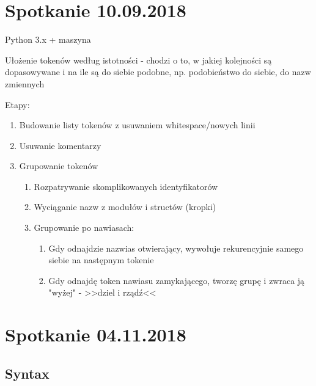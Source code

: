 \documentclass[11pt,oneside,a4paper,onecolumn]{article}
\begin{document}
\section{Spotkanie 10.09.2018}
Python 3.x + maszyna

Ułożenie tokenów według istotności - chodzi o to, w jakiej kolejności są dopasowywane i na ile są do siebie podobne, np. podobieństwo do siebie, do nazw zmiennych

Etapy:
\begin{enumerate}
\item Budowanie listy tokenów z usuwaniem whitespace/nowych linii
\item Usuwanie komentarzy
\item Grupowanie tokenów
\begin{enumerate}
 \item Rozpatrywanie skomplikowanych identyfikatorów
 \item Wyciąganie nazw z modułów i structów (kropki)
 \item Grupowanie po nawiasach: 
 \begin{enumerate}
 	\item Gdy odnajdzie nazwias otwierający, wywołuje rekurencyjnie samego siebie na następnym tokenie
 	\item Gdy odnajdę token nawiasu zamykającego, tworzę grupę i zwraca ją "wyżej" - >>dziel i rządź<<
 \end{enumerate}
\end{enumerate}

\end{enumerate}

\section{Spotkanie 04.11.2018}

\subsection{Syntax}
\end{document}
